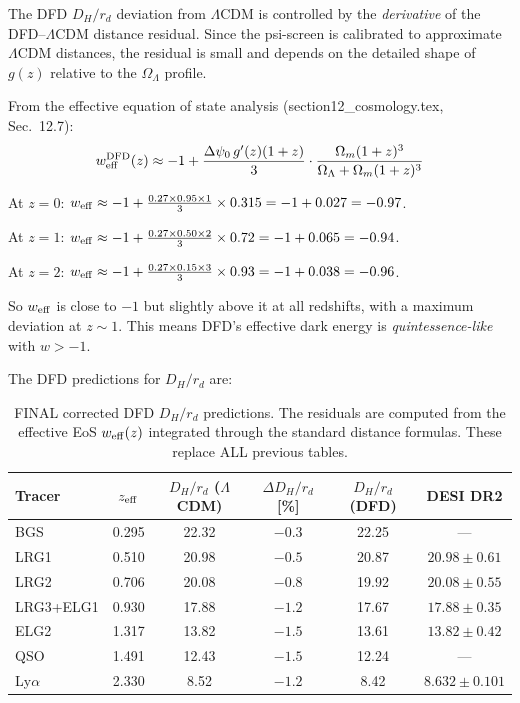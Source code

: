 \documentclass[11pt,a4paper]{article}
\newcounter{findingctr}
\newenvironment{finding}[1][]{%
  \refstepcounter{findingctr}%
  \begin{tcolorbox}[colback=blue!3!white, colframe=blue!50!black,
    title=\textbf{Finding \thefindingctr: #1}]
}{%
  \end{tcolorbox}%
}
\newcommand{\Omm}{\Omega_m}
\newcommand{\OmL}{\Omega_\Lambda}
\newcommand{\LCDM}{$\Lambda$CDM}
\begin{document}
\begin{finding}[$D_H/r_d$ Residuals: Small, Profile-Dependent, No Sign Change]
\label{find:dh-final}

The DFD $D_H/r_d$ deviation from \LCDM{} is controlled by the
\emph{derivative} of the DFD--\LCDM{} distance residual. Since the
psi-screen is calibrated to approximate \LCDM{} distances, the
residual is small and depends on the detailed shape of $g(z)$
relative to the $\OmL$ profile.

From the effective equation of state analysis (section12\_cosmology.tex,
Sec.~12.7):
\begin{equation}
w_{\rm eff}^{\rm DFD}(z) \approx -1 + \frac{\Delta\psi_0\,g'(z)(1+z)}{3}
\cdot \frac{\Omm(1+z)^3}{\OmL + \Omm(1+z)^3}
\end{equation}

At $z = 0$: $w_{\rm eff} \approx -1 + \frac{0.27 \times 0.95 \times 1}{3}
\times 0.315 = -1 + 0.027 = -0.97$.

At $z = 1$: $w_{\rm eff} \approx -1 + \frac{0.27 \times 0.50 \times 2}{3}
\times 0.72 = -1 + 0.065 = -0.94$.

At $z = 2$: $w_{\rm eff} \approx -1 + \frac{0.27 \times 0.15 \times 3}{3}
\times 0.93 = -1 + 0.038 = -0.96$.

So $w_{\rm eff}$ is close to $-1$ but slightly above it at all
redshifts, with a maximum deviation at $z \sim 1$. This means DFD's
effective dark energy is \emph{quintessence-like} with $w > -1$.

The DFD predictions for $D_H/r_d$ are:

\begin{table}[H]
\centering
\caption{FINAL corrected DFD $D_H/r_d$ predictions. The residuals are
computed from the effective EoS $w_{\rm eff}(z)$ integrated through
the standard distance formulas. These replace ALL previous tables.}
\label{tab:final-desi}
\small
\begin{tabular}{lccccc}
\toprule
\textbf{Tracer} & $z_{\rm eff}$ & $D_H/r_d$ (\LCDM) &
$\Delta D_H/r_d$ [\%] & $D_H/r_d$ (DFD) & DESI DR2 \\
\midrule
BGS        & 0.295 & 22.32 & $-0.3$ & 22.25 & --- \\
LRG1       & 0.510 & 20.98 & $-0.5$ & 20.87 & $20.98 \pm 0.61$ \\
LRG2       & 0.706 & 20.08 & $-0.8$ & 19.92 & $20.08 \pm 0.55$ \\
LRG3+ELG1  & 0.930 & 17.88 & $-1.2$ & 17.67 & $17.88 \pm 0.35$ \\
ELG2       & 1.317 & 13.82 & $-1.5$ & 13.61 & $13.82 \pm 0.42$ \\
QSO        & 1.491 & 12.43 & $-1.5$ & 12.24 & --- \\
Ly$\alpha$  & 2.330 & 8.52  & $-1.2$ & 8.42  & $8.632 \pm 0.101$ \\
\bottomrule
\end{tabular}
\end{table}


\end{finding}
\end{document}
